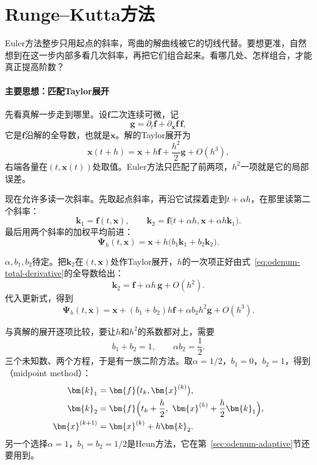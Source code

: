 \section{Runge--Kutta方法}
\label{sec:odenum-runge-kutta}

Euler方法整步只用起点的斜率，弯曲的解曲线被它的切线代替。要想更准，自然想到在这一步内部多看几次斜率，再把它们组合起来。看哪几处、怎样组合，才能真正提高阶数？

\paragraph{主要思想：匹配Taylor展开}
先看真解一步走到哪里。设$\bm{f}$二次连续可微，记
\begin{equation}
 \bm{g}=\partial_t\bm{f}+\partial_{\bm{x}}\bm{f}\,\bm{f},
 \label{eq:odenum-total-derivative}
\end{equation}
它是$\bm{f}$沿解的全导数，也就是$\ddot{\bm{x}}$。解的Taylor展开为
\[
 \bm{x}(t+h)=\bm{x}+h\bm{f}+\frac{h^2}{2}\bm{g}+O(h^3),
\]
右端各量在$(t,\bm{x}(t))$处取值。Euler方法只匹配了前两项，$h^2$一项就是它的局部误差。

现在允许多读一次斜率。先取起点斜率，再沿它试探着走到$t+\alpha h$，在那里读第二个斜率：
\[
 \bm{k}_1=\bm{f}(t,\bm{x}),\qquad
 \bm{k}_2=\bm{f}\bigl(t+\alpha h,\bm{x}+\alpha h\bm{k}_1\bigr).
\]
最后用两个斜率的加权平均前进：
\[
 \bm{\Psi}_h(t,\bm{x})=\bm{x}+h\bigl(b_1\bm{k}_1+b_2\bm{k}_2\bigr).
\]

$\alpha,b_1,b_2$待定。把$\bm{k}_2$在$(t,\bm{x})$处作Taylor展开，$h$的一次项正好由式~\eqref{eq:odenum-total-derivative}的全导数给出：
\[
 \bm{k}_2=\bm{f}+\alpha h\,\bm{g}+O(h^2).
\]
代入更新式，得到
\[
 \bm{\Psi}_h(t,\bm{x})=\bm{x}+(b_1+b_2)h\bm{f}+\alpha b_2h^2\bm{g}+O(h^3).
\]

与真解的展开逐项比较，要让$h$和$h^2$的系数都对上，需要
\begin{equation}
 b_1+b_2=1,\qquad \alpha b_2=\frac{1}{2}.
 \label{eq:odenum-two-stage-conditions}
\end{equation}
三个未知数、两个方程，于是有一族二阶方法。取$\alpha=1/2$，$b_1=0$，$b_2=1$，得到（midpoint method）：
\begin{equation}
 \begin{aligned}
  \bm{k}_1&=\bm{f}\bigl(t_k,\bm{x}^{(k)}\bigr),\\
  \bm{k}_2&=\bm{f}\Bigl(t_k+\frac{h}{2},\ \bm{x}^{(k)}+\frac{h}{2}\bm{k}_1\Bigr),\\
  \bm{x}^{(k+1)}&=\bm{x}^{(k)}+h\bm{k}_2.
 \end{aligned}
 \label{eq:odenum-midpoint}
\end{equation}
另一个选择$\alpha=1$，$b_1=b_2=1/2$是Heun方法，它在第~\ref{sec:odenum-adaptive}节还要用到。

